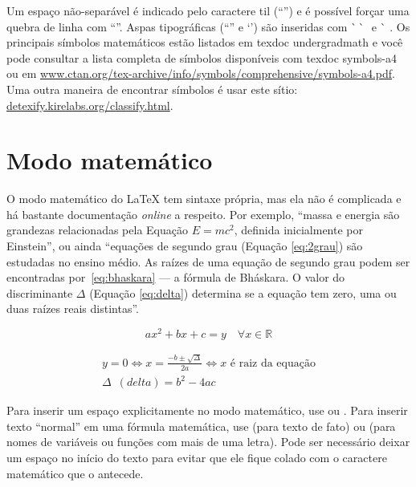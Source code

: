 Um espaço não-separável é indicado pelo caractere til
(``\cmd{\textasciitilde{}}'') e é possível forçar uma quebra de linha com
``\cmd{\sla\sla{}}''. Aspas tipográficas (``\;'' e `\;') são inseridas
com \`\space\,\`\space\space\,\textquotesingle\,\textquotesingle{} e
\`\space\,\,\textquotesingle. Os principais símbolos matemáticos estão
listados em \textsf{texdoc undergradmath} e você pode consultar a lista
completa de símbolos disponíveis com \textsf{texdoc symbols-a4} ou em
\url{www.ctan.org/tex-archive/info/symbols/comprehensive/symbols-a4.pdf}.
Uma outra maneira de encontrar símbolos é usar este sítio:
\url{detexify.kirelabs.org/classify.html}.

\section{Modo matemático}

O modo matemático do \LaTeX{} tem sintaxe própria, mas ela não é complicada e
há bastante documentação \emph{online} a respeito. Por exemplo, ``massa e
energia são grandezas relacionadas pela Equação $E=mc^2$, definida inicialmente
por Einstein'', ou ainda ``equações de segundo grau (Equação \ref{eq:2grau})
são estudadas no ensino médio. As raízes de uma equação de segundo grau podem
ser encontradas por~\eqref{eq:bhaskara} --- a fórmula de Bháskara.
O valor do discriminante $\Delta$ (Equação \ref{eq:delta}) determina se a
equação tem zero, uma ou duas raízes reais distintas''.

\begin{equation}
  \label{eq:2grau}
  ax^2+bx+c=y \quad \forall x \in \mathbb{R}
\end{equation}

\begin{gather}
  \label{eq:bhaskara}
    y=0 \Leftrightarrow x=\frac{-b \pm \sqrt{\Delta}}{2a}
    \Leftrightarrow x \text{ é raiz da equação}\\
  \label{eq:delta}
    \Delta\enspace(\mathit{delta}) = b^2-4ac
\end{gather}

Para inserir um espaço explicitamente no modo matemático, use
 ou . Para inserir texto ``normal'' em
uma fórmula matemática, use  (para texto de fato)
ou  (para nomes de variáveis ou funções com
mais de uma letra). Pode ser necessário deixar um espaço no início do
texto para evitar que ele fique colado com o caractere matemático que
o antecede.

